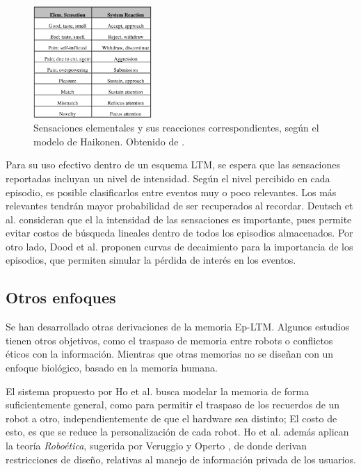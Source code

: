\begin{figure}[H]
\centering
\includegraphics[width=0.4\textwidth]{./figures/haikonen.png}
\caption{\small Sensaciones elementales y sus reacciones correspondientes, según el modelo de Haikonen. Obtenido de \cite{Dodd2005}.}
\label{img:emotional_haikonen}
\end{figure}

Para su uso efectivo dentro de un esquema LTM, se espera que las sensaciones reportadas incluyan un nivel de intensidad. Según el nivel percibido en cada episodio, es posible clasificarlos entre eventos muy o poco relevantes. Los más relevantes tendrán mayor probabilidad de ser recuperados al recordar. Deutsch et al. \cite{Deutsch2008} consideran que el la intensidad de las sensaciones es importante, pues permite evitar costos de búsqueda lineales dentro de todos los episodios almacenados. Por otro lado, Dood et al. proponen curvas de decaimiento para la importancia de los episodios, que permiten simular la pérdida de interés en los eventos.






\subsection{Otros enfoques}

Se han desarrollado otras derivaciones de la memoria Ep-LTM. Algunos estudios tienen otros objetivos, como el traspaso de memoria entre robots o conflictos éticos con la información. Mientras que otras memorias no se diseñan con un enfoque biológico, basado en la memoria humana.

El sistema propuesto por Ho et al. \cite{Ho2009} busca modelar la memoria de forma suficientemente general, como para permitir el traspaso de los recuerdos de un robot a otro, independientemente de que el hardware sea distinto; El costo de esto, es que se reduce la personalización de cada robot. Ho et al. además aplican la teoría \textit{Roboética}, sugerida por Veruggio y Operto \cite{Veruggio2006}, de donde derivan restricciones de diseño, relativas al manejo de información privada de los usuarios.

